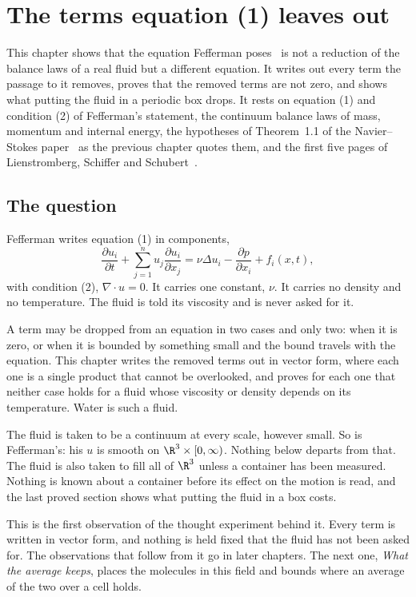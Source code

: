 \chapter{The terms equation (1) leaves out}

This chapter shows that the equation Fefferman poses~\cite{src:Fefferman} is not a reduction of
the balance laws of a real fluid but a different equation. It writes out every term the passage to
it removes, proves that the removed terms are not zero, and shows what putting the fluid in a
periodic box drops. It rests on equation (1) and condition (2) of Fefferman's statement, the
continuum balance laws of mass, momentum and internal energy, the hypotheses of Theorem~1.1 of the
Navier--Stokes paper~\cite{src:OpenAI-2026-Navier-Stokes} as the previous chapter quotes them, and
the first five pages of Lienstromberg, Schiffer and
Schubert~\cite{src:Lienstromberg-Schiffer-Schubert-2025}.

\section{The question}

Fefferman writes equation (1) in components,
\[
\frac{\partial u_i}{\partial t} + \sum_{j=1}^{n} u_j \frac{\partial u_i}{\partial x_j}
= \nu \Delta u_i - \frac{\partial p}{\partial x_i} + f_i(x,t),
\]
with condition (2), $\nabla\cdot u = 0$. It carries one constant, $\nu$. It carries no density and
no temperature. The fluid is told its viscosity and is never asked for it.

A term may be dropped from an equation in two cases and only two: when it is zero, or when it is
bounded by something small and the bound travels with the equation. This chapter writes the
removed terms out in vector form, where each one is a single product that cannot be overlooked,
and proves for each one that neither case holds for a fluid whose viscosity or density depends on
its temperature. Water is such a fluid.

The fluid is taken to be a continuum at every scale, however small. So is Fefferman's:
his $u$ is smooth on $\R^3\times[0,\infty)$. Nothing below departs from that. The fluid is also
taken to fill all of $\R^3$ unless a container has been measured. Nothing is known about a
container before its effect on the motion is read, and the last proved section shows what putting
the fluid in a box costs.

This is the first observation of the thought experiment behind it. Every term is written in vector
form, and nothing is held fixed that the fluid has not been asked for. The observations that follow
from it go in later chapters. The next one, \emph{What the average keeps}, places the molecules
in this field and bounds where an average of the two over a cell holds.

